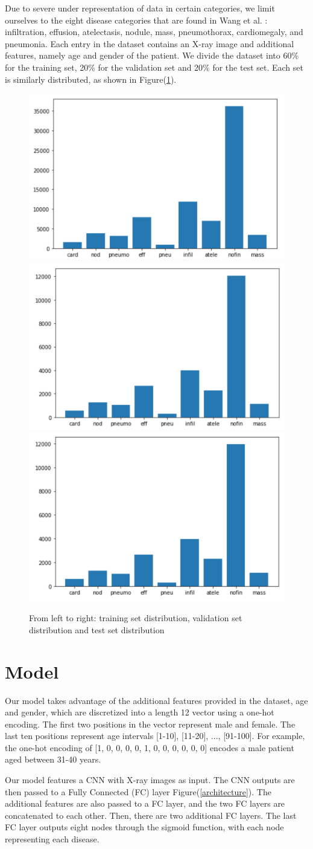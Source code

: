 \documentclass[10pt,letterpaper]{article}
\begin{document}
Due to severe under representation of data in certain categories, we limit ourselves to the eight disease categories that are found in Wang et al. \cite{1705.02315} : infiltration, effusion, atelectasis, nodule, mass, pneumothorax, cardiomegaly, and pneumonia. Each entry in the dataset contains an X-ray image and additional features, namely age and gender of the patient.  We divide the dataset into 60\% for the training set, 20\% for the validation set and 20\% for the test set. Each set is similarly distributed, as shown in Figure(\ref{dataset}).
\begin{figure}[htb]
	\centering
	\includegraphics[width=0.3\linewidth]{./trainset.png}
	\includegraphics[width=0.3\linewidth]{./valset.png}
	\includegraphics[width=0.3\linewidth]{./testset.png}
	\caption{From left to right: training set distribution, validation set distribution and test set distribution}
	\label{dataset}
\end{figure}

\section{Model}
Our model takes advantage of the additional features provided in the dataset, age and gender, which are discretized into a length 12 vector using a one-hot encoding. The first two positions in the vector represent male and female. The last ten positions represent age intervals [1-10], [11-20], ..., [91-100]. For example, the one-hot encoding of [1, 0, 0, 0, 0, 1, 0, 0, 0, 0, 0, 0] encodes a male patient aged between 31-40 years.

Our model features a CNN with X-ray images as input. The CNN outputs are then passed to a Fully Connected (FC) layer Figure(\ref{architecture}). The additional features are also passed to a FC layer, and the two FC layers are concatenated to each other. Then, there are two additional FC layers. The last FC layer outputs eight nodes through the sigmoid function, with each node representing each disease.
\end{document}
